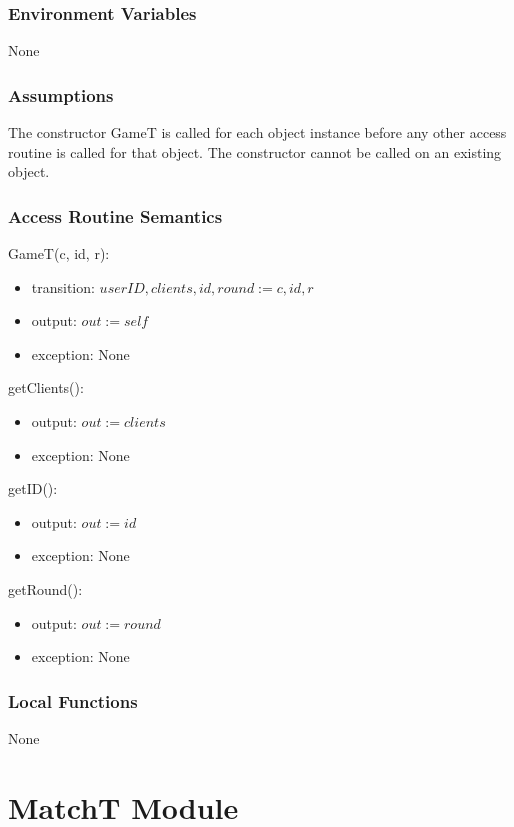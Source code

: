 \documentclass[12pt, titlepage]{article}
\begin{document}
\subsubsection{Environment Variables}

None

\subsubsection{Assumptions}
The constructor GameT is called for each object instance before any other access routine is called for that object. The constructor cannot be called on an existing object.

\subsubsection{Access Routine Semantics}

\noindent GameT(c, id, r):
\begin{itemize}
\item transition: $userID, clients, id, round := c, id, r$
\item output: $out := self$
\item exception: None
\end{itemize}

\noindent getClients():
\begin{itemize}
\item output: $out := clients$
\item exception: None
\end{itemize}

\noindent getID():
\begin{itemize}
\item output: $out := id$
\item exception: None
\end{itemize}

\noindent getRound():
\begin{itemize}
\item output: $out := round$
\item exception: None
\end{itemize}

\subsubsection{Local Functions}

None
\newpage

\section{MatchT Module} \label{MatchT}
\end{document}
